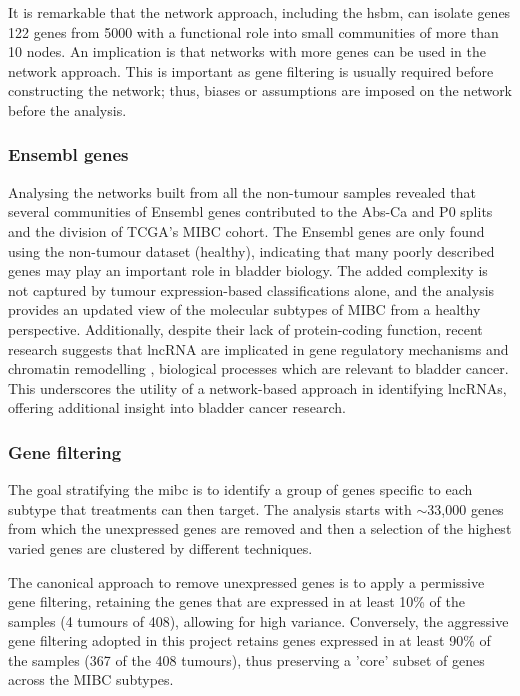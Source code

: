 It is remarkable that the network approach, including the \acrshort{hsbm}, can isolate genes 122 genes from 5000 with a functional role into small communities of more than 10 nodes. An implication is that networks with more genes can be used in the network approach. This is important as gene filtering is usually required before constructing the network; thus, biases or assumptions are imposed on the network before the analysis.

\subsubsection*{Ensembl genes}

Analysing the networks built from all the non-tumour samples revealed that several communities of Ensembl genes contributed to the Abs-Ca and P0 splits and the division of TCGA's MIBC cohort. The Ensembl genes are only found using the non-tumour dataset (healthy), indicating that many poorly described genes may play an important role in bladder biology. The added complexity is not captured by tumour expression-based classifications alone, and the analysis provides an updated view of the molecular subtypes of MIBC from a healthy perspective. Additionally, despite their lack of protein-coding function, recent research suggests that \acrlong{lncRNA} are implicated in gene regulatory mechanisms and chromatin remodelling \citep{Statello2021-md}, biological processes which are relevant to bladder cancer. This underscores the utility of a network-based approach in identifying lncRNAs, offering additional insight into bladder cancer research.


\subsubsection*{Gene filtering} \label{s:discussion:gene_filt}

The goal stratifying the \acrshort{mibc} is to identify a group of genes specific to each subtype that treatments can then target. The analysis starts with $\sim$33,000 genes from which the unexpressed genes are removed and then a selection of the highest varied genes are clustered by different techniques.

The canonical approach to remove unexpressed genes is to apply a permissive gene filtering, retaining the genes that are expressed in at least 10\% of the samples (4 tumours of 408), allowing for high variance. Conversely, the aggressive gene filtering adopted in this project retains genes expressed in at least 90\% of the samples (367 of the 408 tumours), thus preserving a 'core' subset of genes across the \gls{MIBC} subtypes.

